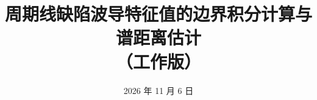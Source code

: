 \title{周期线缺陷波导特征值的边界积分计算与谱距离估计%
  \ifclean\else\\\large（工作版）\fi}
\author{}
\date{2026 年 11 月 6 日}



\maketitle



















\clearpage




